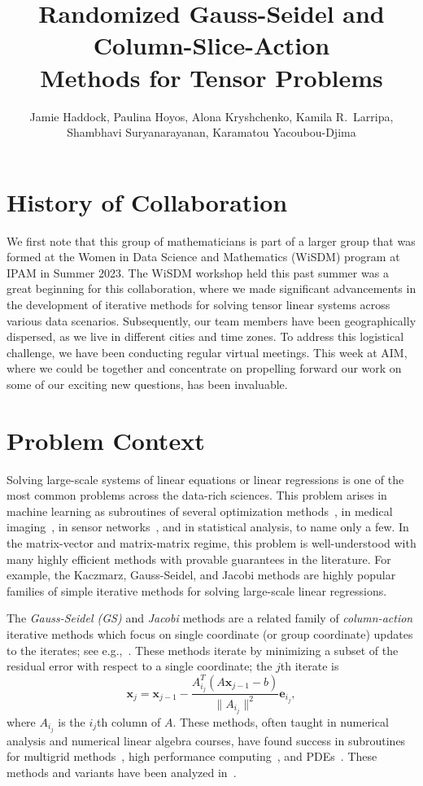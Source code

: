 \documentclass[10.5pt]{amsart}
\title{\textbf{Randomized Gauss-Seidel and Column-Slice-Action \\Methods for Tensor Problems}}
\author{Jamie Haddock, Paulina Hoyos, Alona Kryshchenko, Kamila R.\ Larripa, \\ Shambhavi Suryanarayanan, Karamatou Yacoubou-Djima}
\def\ve{{\bm{e}}}
\def\vx{{\bm{x}}}
\begin{document}
\maketitle

\vspace{-2em}
\section{History of Collaboration}
We first note that this group of mathematicians is part of a larger group that was formed at the Women in Data Science and Mathematics (WiSDM) program at IPAM in Summer 2023.  
The WiSDM workshop held this past summer was a great beginning for this collaboration, where we made significant advancements in the development of iterative methods for solving tensor linear systems across various data scenarios. Subsequently, our team members have been geographically dispersed, as we live in different cities and time zones. To address this logistical challenge, we have been conducting regular virtual meetings. This week at AIM, where we could be together and concentrate on propelling forward our work on some of our exciting new questions, has been invaluable.

\section{Problem Context}

Solving large-scale systems of linear equations or linear regressions is one of the most common problems across the data-rich sciences.  This problem arises in machine learning as subroutines of several optimization methods~\cite{boyd2004convex}, in medical imaging~\cite{Gordon1970,herman1993algebraic}, in sensor networks~\cite{savvides2001dynamic}, and in statistical analysis, to name only a few. In the matrix-vector and matrix-matrix regime, this problem is well-understood with many highly efficient methods with provable guarantees in the literature. For example, the Kaczmarz, Gauss-Seidel, and Jacobi methods are highly popular families of simple iterative methods for solving large-scale linear regressions.

The \emph{Gauss-Seidel (GS)} and \emph{Jacobi} methods are a related family of \emph{column-action} iterative methods which focus on single coordinate (or group coordinate) updates to the iterates; see e.g.,~\cite{golub2013matrix}.  These methods iterate by minimizing a subset of the residual error with respect to a single coordinate; the $j$th iterate is 
\begin{equation}
    \vx_{j} = \vx_{j-1} - \frac{A_{i_j}^T(A \vx_{j-1} - b)}{\|A_{i_{j}}\|^2} \ve_{i_j}, \label{eq:GSupdate}
\end{equation} 
where $A_{i_j}$ is the $i_j$th column of $A$.  These methods, often taught in numerical analysis and numerical linear algebra courses, have found success in subroutines for multigrid methods~\cite{rude1993mathematical,trottenberg2000multigrid}, high performance computing~\cite{wolfson2017distributed}, and PDEs~\cite{glusa2020scalable,magoules2017asynchronous}.  These methods and variants have been analyzed in~\cite{LL10:Randomized-Methods,Ma2015convergence,richtarik2016parallel,frommer2023convergence}. 
\end{document}
